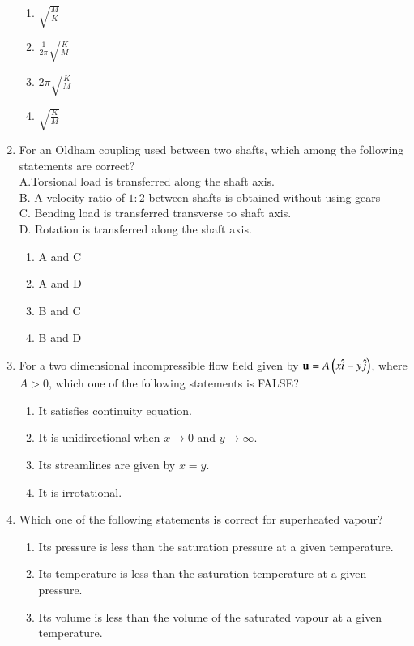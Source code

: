 \documentclass[journal,12pt,onecolumn]{IEEEtran}
\theoremstyle{remark}
\begin{document}
\begin{enumerate}
    \begin{enumerate}
        \item $\sqrt{\frac{M}{K}}$
        \item $\frac{1}{2\pi}\sqrt{\frac{K}{M}}$
        \item $2\pi\sqrt{\frac{K}{M}}$
        \item $\sqrt{\frac{K}{M}}$
    \end{enumerate}
    \item For an Oldham coupling used between two shafts, which among the following statements are correct?\\
    A.\quad Torsional load is transferred along the shaft axis.\\
    B. \quad A velocity ratio of $1:2$ between shafts is obtained without using gears\\
    C. \quad Bending load is transferred transverse to shaft axis.\\
    D. \quad Rotation is transferred along the shaft axis.
    \begin{enumerate}
        \item A and C
        \item A and D
        \item B and C
        \item B and D
    \end{enumerate}
    \item For a two dimensional incompressible flow field given by $\mathbf{u}=A\left(x\hat{i}-y\hat{j}\right)$, where $A>0$, which one of the following statements is FALSE?
    \begin{enumerate}
        \item It satisfies continuity equation.
        \item It is unidirectional when $x \to 0$ and $y \to \infty$.
        \item Its streamlines are given by $x=y$.
        \item It is irrotational.
    \end{enumerate}
    \item Which one of the following statements is correct for superheated vapour?
    \begin{enumerate}
        \item Its pressure is less than the saturation pressure at a given temperature.
        \item Its temperature is less than the saturation temperature at a given pressure.
        \item Its volume is less than the volume of the saturated vapour at a given temperature.

\end{enumerate}
\end{enumerate}
\end{document}
